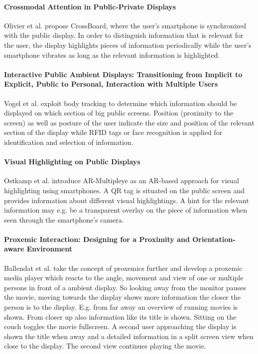 \paragraph{Crossmodal Attention in Public-Private Displays}
Olivier et al. \cite{Olivier_Crossmodal} propose CrossBoard, where the user’s smartphone is synchronized with the public display.
In order to distinguish information that is relevant for the user, the display highlights pieces of information periodically while the user’s smartphone vibrates as long as the relevant information is highlighted.

\paragraph{Interactive Public Ambient Displays: Transitioning from Implicit to Explicit, Public to Personal, Interaction with Multiple Users}
Vogel et al.\cite{Vogel_InteractivePublicAmbient} exploit body tracking to determine which information should be displayed on which section of big public screens. Position (proximity to the screen) as well as posture of the user indicate the size and position of the relevant section of the display while RFID tags or face recognition is applied for identification and selection of information.

\paragraph{Visual Highlighting on Public Displays}
Ostkamp et al. \cite{Ostkamp_VisualHighlighting} introduce AR-Multipleye as an AR-based approach for visual highlighting using smartphones. A QR tag is situated on the public screen and provides information about different visual highlightings. A hint for the relevant information may e.g. be a transparent overlay on the piece of information when seen through the smartphone’s camera.

\paragraph{Proxemic Interaction: Designing for a Proximity and Orientation-aware Environment}
Ballendat et al. \cite{ballendat_proxemic_2010} take the concept of proxemics further and develop a proxemic media player which reacts to the angle, movement and view of one or multiple persons in front of a ambient display.
So looking away from the monitor pauses the movie, moving towards the display shows more information the closer the person is to the display.
E.g. from far away an overview of running movies is shown.
From closer up also information like its title is shown.
Sitting on the couch toggles the movie fullscreen.
A second user approaching the display is shown the title when away and a detailed information in a split screen view when close to the display.
The second view continues playing the movie.

